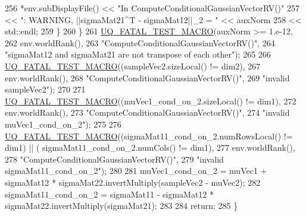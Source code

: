\begin{DoxyCode}
256       *env.subDisplayFile() << \textcolor{stringliteral}{"In ComputeConditionalGaussianVectorRV()"}
257                             << \textcolor{stringliteral}{": WARNING, ||sigmaMat21^T - sigmaMat12||\_2 = "} << auxNorm
258                             << std::endl;
259     \}
260   \}
261   \hyperlink{_defines_8h_a56d63d18d0a6d45757de47fcc06f574d}{UQ\_FATAL\_TEST\_MACRO}(auxNorm >= 1.e-12,
262                       env.worldRank(),
263                       \textcolor{stringliteral}{"ComputeConditionalGaussianVectorRV()"},
264                       \textcolor{stringliteral}{"sigmaMat12 and sigmaMat21 are not transpose of each other"});
265 
266   \hyperlink{_defines_8h_a56d63d18d0a6d45757de47fcc06f574d}{UQ\_FATAL\_TEST\_MACRO}((sampleVec2.sizeLocal() != dim2),
267                       env.worldRank(),
268                       \textcolor{stringliteral}{"ComputeConditionalGaussianVectorRV()"},
269                       \textcolor{stringliteral}{"invalid sampleVec2"});
270 
271   \hyperlink{_defines_8h_a56d63d18d0a6d45757de47fcc06f574d}{UQ\_FATAL\_TEST\_MACRO}((muVec1\_cond\_on\_2.sizeLocal() != dim1),
272                       env.worldRank(),
273                       \textcolor{stringliteral}{"ComputeConditionalGaussianVectorRV()"},
274                       \textcolor{stringliteral}{"invalid muVec1\_cond\_on\_2"});
275 
276   \hyperlink{_defines_8h_a56d63d18d0a6d45757de47fcc06f574d}{UQ\_FATAL\_TEST\_MACRO}((sigmaMat11\_cond\_on\_2.numRowsLocal() != dim1) || (
      sigmaMat11\_cond\_on\_2.numCols() != dim1),
277                       env.worldRank(),
278                       \textcolor{stringliteral}{"ComputeConditionalGaussianVectorRV()"},
279                       \textcolor{stringliteral}{"invalid sigmaMat11\_cond\_on\_2"});
280 
281   muVec1\_cond\_on\_2     = muVec1     + sigmaMat12 * sigmaMat22.invertMultiply(sampleVec2 - muVec2);
282   sigmaMat11\_cond\_on\_2 = sigmaMat11 - sigmaMat12 * sigmaMat22.invertMultiply(sigmaMat21);
283 
284   \textcolor{keywordflow}{return};
285 \}
\end{DoxyCode}
